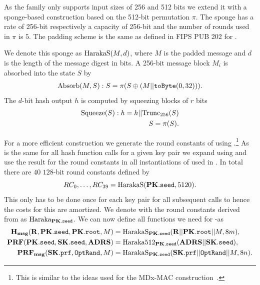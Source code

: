    As
   the \haraka family only supports input sizes of 256 and 512 bits we extend it
   with a sponge-based construction based on the 512-bit permutation $\pi$. The 
   sponge has a rate of 256-bit respectively a capacity of 256-bit and the 
   number of rounds used in $\pi$ is $5$. The padding scheme is the same as 
   defined in FIPS PUB 202 for \shathree.

   We denote this sponge as $\text{HarakaS}(M, d)$, where $M$ is the padded
   message and $d$ is the length of the message digest in bits. A 256-bit 
   message block $M_i$ is absorbed into the state $S$ by
   \begin{equation}
      \begin{aligned}
      \text{Absorb}(M, S): S = \pi(S \oplus (M || \texttt{toByte}(0, 32))).
      \end{aligned}
   \end{equation}
   The $d$-bit hash output $h$ is computed by squeezing blocks of $r$ bits
   \begin{equation}
      \begin{aligned}
      \text{Squeeze}(S): h = h || \text{Trunc}_{256}(S)\\
                         S = \pi(S).
      \end{aligned}
   \end{equation}
   
   For a more efficient construction we generate the round constants of 
   \haraka using \pseed.\footnote{This is similar to the ideas used for the 
   MDx-MAC construction~\cite{DBLP:conf/crypto/PrenelO95}.} As \pseed is the 
   same for all hash function calls for a given key pair we expand \pseed 
   using \harakasponge and use the result for the round constants in all 
   instantiations of \haraka used in \spx. In total there are $40$ $128$-bit
   round constants defined by
   \begin{equation}
      RC_0,\ldots,RC_{39} = \text{HarakaS}(\mathbf{PK}.\texttt{seed}, 5120).
   \end{equation}
   This only has to be done once for each key pair for all subsequent calls 
   to \haraka hence the costs for this are amortized. We denote \haraka with 
   the round constants derived from \pseed as $\text{Haraka}_{\mathbf{PK}.\texttt{seed}}$. We can now define 
   all functions we need for \spx-\haraka as
   \begin{equation}
   \begin{aligned}
      \mathbf{H_{msg}}(\mathbf{R},\mathbf{PK}.\texttt{seed}, \mathbf{PK}.\texttt{root}, M) &= \text{HarakaS}_{\mathbf{PK}.\texttt{seed}}(\mathbf{R} || \mathbf{PK}.\texttt{root} || M, 8m),\\
      \mathbf{PRF}(\mathbf{PK}.\texttt{seed}, \mathbf{SK}.\texttt{seed}, \textbf{ADRS}) &= \text{Haraka}512_{\mathbf{PK}.\texttt{seed}}(\textbf{ADRS} || \mathbf{SK}.\texttt{seed}),\\
      \mathbf{PRF_{msg}}(\mathbf{SK}.\texttt{prf}, \texttt{OptRand}, M) &= \text{HarakaS}_{\mathbf{PK}.\texttt{seed}}(\mathbf{SK}.\texttt{prf} || \texttt{OptRand} || M, 8n).\\
   \end{aligned}
   \end{equation}

